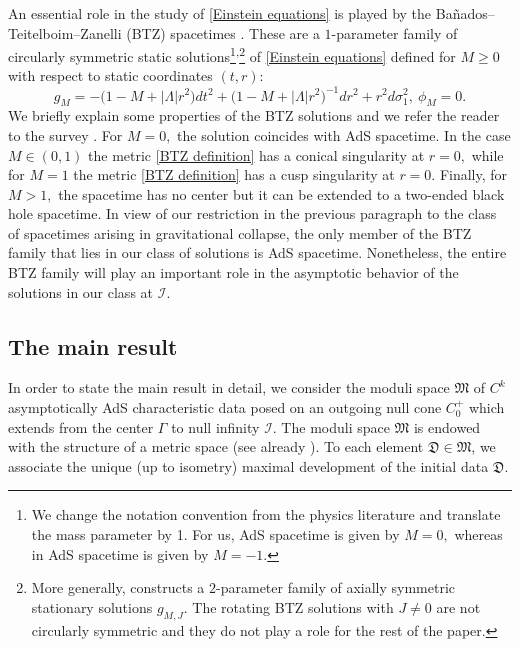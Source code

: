 \documentclass[11pt]{article}
\numberwithin{equation}{section}
\begin{document}
An essential role in the study of \eqref{Einstein equations} is played by the Bañados--Teitelboim--Zanelli (BTZ) spacetimes \cite{BTZ}. These are a $1$-parameter family of circularly symmetric static solutions\footnote{We change the notation convention from the physics literature and translate the mass parameter by 1. For us, AdS spacetime is given by $M=0,$ whereas in \cite{BTZ} AdS spacetime is given by $M=-1$.}\textsuperscript{,}\footnote{More generally, \cite{BTZ} constructs a $2$-parameter family of axially symmetric stationary solutions $g_{M,J}$. The rotating BTZ solutions with $J\neq0$ are not circularly symmetric and they do not play a role for the rest of the paper.} of \eqref{Einstein equations} defined for $M\geq0$ with respect to static coordinates $(t,r):$
\begin{equation}\label{BTZ definition}
    g_M=-\Big(1-M+|\Lambda|r^2\Big)dt^2+\Big(1-M+|\Lambda|r^2\Big)^{-1}dr^2+r^2d\sigma_1^2,\ \phi_{M}=0.
\end{equation}
We briefly explain some properties of the BTZ solutions and we refer the reader to the survey \cite{BTZsurvey}. For $M=0,$ the solution coincides with AdS spacetime. In the case $M\in(0,1)$ the metric \eqref{BTZ definition} has a conical singularity at $r=0,$ while for $M=1$ the metric \eqref{BTZ definition} has a cusp singularity at $r=0$. Finally, for $M>1,$ the spacetime has no center but it can be extended to a two-ended black hole spacetime. In view of our restriction in the previous paragraph to the class of spacetimes arising in gravitational collapse, the only member of the BTZ family that lies in our class of solutions is AdS spacetime. Nonetheless, the entire BTZ family will play an important role in the asymptotic behavior of the solutions in our class at $\mathcal{I}.$

\subsection{The main result}

In order to state the main result in detail, we consider the moduli space $\mathfrak{M}$ of $C^k$ asymptotically AdS characteristic data posed on an outgoing null cone $C_0^+$ which extends from the center $\Gamma$ to null infinity $\mathcal{I}$. The moduli space $\mathfrak{M}$ is endowed with the structure of a metric space (see already ). To each element $\mathfrak{D}\in\mathfrak{M}$, we associate the unique (up to isometry) maximal development of the initial data $\mathfrak{D}.$
\end{document}

